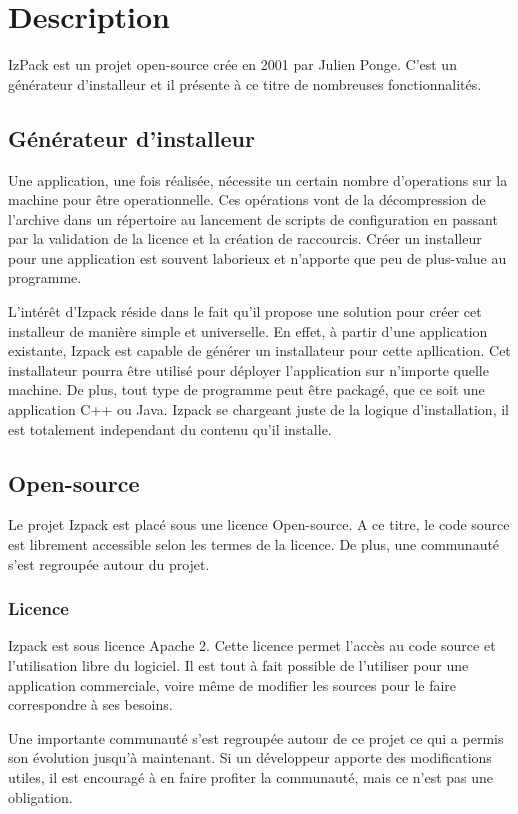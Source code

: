 \section{Description}
IzPack est un projet open-source crée en 2001 par Julien Ponge. C'est un générateur d'installeur et il présente à ce titre de nombreuses fonctionnalités.
\subsection{Générateur d'installeur}
Une application, une fois réalisée, nécessite un certain nombre d'operations sur la machine pour être operationnelle.
Ces opérations vont de la décompression de l'archive dans un répertoire au lancement de scripts de configuration en passant par la validation de la licence et la création de raccourcis.
Créer un installeur pour une application est souvent laborieux et n'apporte que peu de plus-value au programme. 

L'intérêt d'Izpack réside dans le fait qu'il propose une solution pour créer cet installeur de manière simple et universelle.
En effet, à partir d'une application existante, Izpack est capable de générer un installateur pour cette apllication. Cet installateur pourra être utilisé pour déployer l'application sur n'importe quelle machine.
De plus, tout type de programme peut être packagé, que ce soit une application C++ ou Java. Izpack se chargeant juste de la logique d'installation, il est totalement independant du contenu qu'il installe.
\subsection{Open-source}
Le projet Izpack est placé sous une licence Open-source. A ce titre, le code source est librement accessible selon les termes de la licence. De plus, une communauté s'est regroupée autour du projet.
\subsubsection{Licence}
Izpack est sous licence Apache 2. Cette licence permet l'accès au code source et l'utilisation libre du logiciel.
Il est tout à fait possible de l'utiliser pour une application commerciale, voire même de modifier les sources pour le faire correspondre à ses besoins.

Une importante communauté s'est regroupée autour de ce projet ce qui a permis son évolution jusqu'à maintenant.
Si un développeur apporte des modifications utiles, il est encouragé à en faire profiter la communauté, mais ce n'est pas une obligation.
